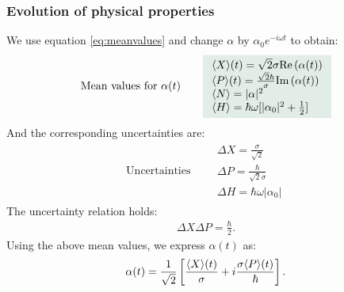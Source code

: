 \subsubsection{Evolution of physical properties}
We use equation \eqref{eq:meanvalues} and change $\alpha$ by $\alpha_0e^{-i\omega t}$ to obtain:
\begin{align}
    \text{Mean values for $\alpha(t)$}\qquad\highlight{\begin{array}{l}
        \braket{X}(t)=\sqrt{2}\sigma\re{\alpha(t)}\\
        \braket{P}(t)=\frac{\sqrt{2}\hbar}{\sigma}\im{\alpha(t)}\\
        \braket{N}=|\alpha|^2\\
        \braket{H}=\hbar\omega[|\alpha_0|^2+\frac{1}{2}]
    \end{array}}
\end{align}
And the corresponding uncertainties are:
\begin{align}
    \text{Uncertainties}\qquad\begin{array}{l}
        \Delta X=\frac{\sigma}{\sqrt{2}}\\
        \Delta P=\frac{\hbar}{\sqrt{2}\sigma}\\
        \Delta H=\hbar\omega|\alpha_0|
    \end{array}
\end{align}
The uncertainty relation holds: 
\begin{align*}
    \Delta X\Delta P=\frac{\hbar}{2}.
\end{align*}
Using the above mean values, we express $\alpha(t)$ as:
\begin{align}
    \alpha(t)=\frac{1}{\sqrt{2}}\left[\frac{\langle X\rangle(t)}{\sigma}+i\frac{\sigma\langle P\rangle(t)}{\hbar}\right].
\end{align}
%
